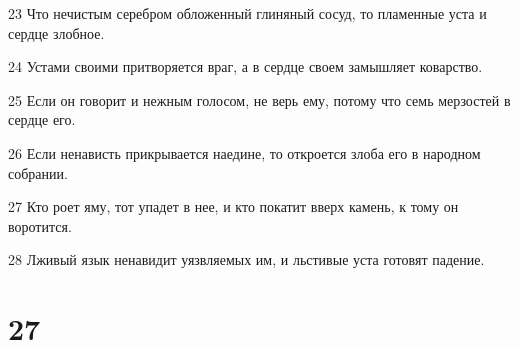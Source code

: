 \par 23 Что нечистым серебром обложенный глиняный сосуд, то пламенные уста и сердце злобное.
\par 24 Устами своими притворяется враг, а в сердце своем замышляет коварство.
\par 25 Если он говорит и нежным голосом, не верь ему, потому что семь мерзостей в сердце его.
\par 26 Если ненависть прикрывается наедине, то откроется злоба его в народном собрании.
\par 27 Кто роет яму, тот упадет в нее, и кто покатит вверх камень, к тому он воротится.
\par 28 Лживый язык ненавидит уязвляемых им, и льстивые уста готовят падение.

\chapter{27}

